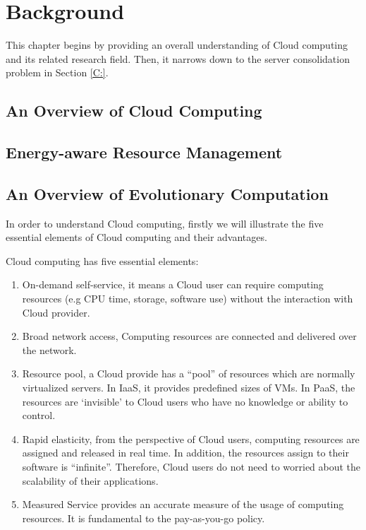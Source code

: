 \section{Background}

This chapter begins by providing an overall understanding of Cloud computing and its related research field.
Then, it narrows down to the server consolidation problem in Section \ref{C:}. 

\subsection{An Overview of Cloud Computing}
\subsection{Energy-aware Resource Management}
\subsection{An Overview of Evolutionary Computation}


In order to understand Cloud computing, firstly we will illustrate the five essential elements of Cloud computing and their advantages.

Cloud computing has five essential elements:
\begin{enumerate}
 \item On-demand self-service, it means a Cloud user can require computing resources (e.g CPU time, storage, software use) without the interaction with Cloud provider.
 \item Broad network access, Computing resources are connected and delivered over the network.
 \item Resource pool, a Cloud provide has a ``pool'' of resources which are normally virtualized servers. In IaaS, it provides predefined sizes of VMs. In PaaS, the resources are `invisible' to Cloud users who have no knowledge or ability to control. 
 \item Rapid elasticity, from the perspective of Cloud users, computing resources are assigned and released in
real time. In addition, the resources assign to their software is ``infinite''. Therefore, Cloud users do not need to worried about the scalability of their applications.
 \item Measured Service provides an accurate measure of the usage of computing resources. It is fundamental to the pay-as-you-go policy.
\end{enumerate}

